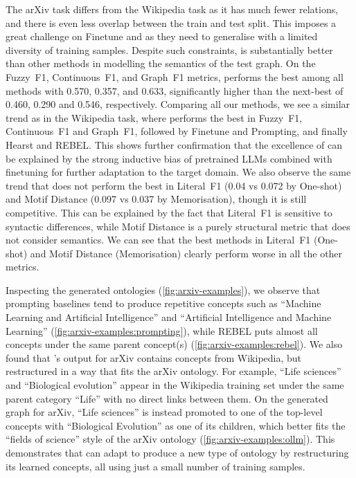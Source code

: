 The arXiv task differs from the Wikipedia task as it has much fewer relations, and there is even less overlap between the train and test split. This imposes a great challenge on Finetune and \name as they need to generalise with a limited diversity of training samples. Despite such constraints, \name is substantially better than other methods in modelling the semantics of the test graph.
On the Fuzzy~F1, Continuous~F1, and Graph~F1 metrics, \name performs the best among all methods with 0.570, 0.357, and 0.633, significantly higher than the next-best of 0.460, 0.290 and 0.546, respectively. Comparing all our methods, we see a similar trend as in the Wikipedia task, where \name performs the best in Fuzzy~F1, Continuous~F1 and Graph~F1, followed by Finetune and Prompting, and finally Hearst and REBEL. This shows further confirmation that the excellence of \name can be explained by the strong inductive bias of pretrained LLMs combined with finetuning for further adaptation to the target domain. We also observe the same trend that \name does not perform the best in Literal~F1 (0.04 vs 0.072 by One-shot) and Motif Distance (0.097 vs 0.037 by Memorisation), though it is still competitive. This can be explained by the fact that Literal~F1 is sensitive to syntactic differences, while Motif Distance is a purely structural metric that does not consider semantics. We can see that the best methods in Literal~F1 (One-shot) and Motif Distance (Memorisation) clearly perform worse in all the other metrics.



Inspecting the generated ontologies (\cref{fig:arxiv-examples}), we observe that prompting baselines tend to produce repetitive concepts such as ``Machine Learning and Artificial Intelligence'' and ``Artificial Intelligence and Machine Learning'' (\cref{fig:arxiv-examples:prompting}), while REBEL puts almost all concepts under the same parent concept(s) (\cref{fig:arxiv-examples:rebel}).
We also found that \name's output for arXiv contains concepts from Wikipedia, but restructured in a way that fits the arXiv ontology. For example, ``Life sciences'' and ``Biological evolution'' appear in the Wikipedia training set under the same parent category ``Life'' with no direct links between them. On the generated graph for arXiv, ``Life sciences'' is instead promoted to one of the top-level concepts with ``Biological Evolution'' as one of its children, which better fits the ``fields of science'' style of the arXiv ontology (\cref{fig:arxiv-examples:ollm}). This demonstrates that \name can adapt to produce a new type of ontology by restructuring its learned concepts, all using just a small number of training samples.

